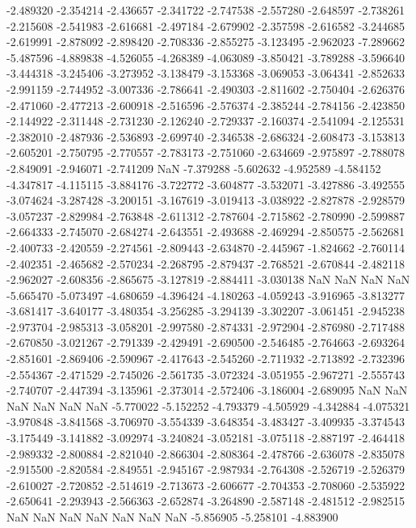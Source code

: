 -2.489320
-2.354214
-2.436657
-2.341722
-2.747538
-2.557280
-2.648597
-2.738261
-2.215608
-2.541983
-2.616681
-2.497184
-2.679902
-2.357598
-2.616582
-3.244685
-2.619991
-2.878092
-2.898420
-2.708336
-2.855275
-3.123495
-2.962023
-7.289662
-5.487596
-4.889838
-4.526055
-4.268389
-4.063089
-3.850421
-3.789288
-3.596640
-3.444318
-3.245406
-3.273952
-3.138479
-3.153368
-3.069053
-3.064341
-2.852633
-2.991159
-2.744952
-3.007336
-2.786641
-2.490303
-2.811602
-2.750404
-2.626376
-2.471060
-2.477213
-2.600918
-2.516596
-2.576374
-2.385244
-2.784156
-2.423850
-2.144922
-2.311448
-2.731230
-2.126240
-2.729337
-2.160374
-2.541094
-2.125531
-2.382010
-2.487936
-2.536893
-2.699740
-2.346538
-2.686324
-2.608473
-3.153813
-2.605201
-2.750795
-2.770557
-2.783173
-2.751060
-2.634669
-2.975897
-2.788078
-2.849091
-2.946071
-2.741209
NaN
-7.379288
-5.602632
-4.952589
-4.584152
-4.347817
-4.115115
-3.884176
-3.722772
-3.604877
-3.532071
-3.427886
-3.492555
-3.074624
-3.287428
-3.200151
-3.167619
-3.019413
-3.038922
-2.827878
-2.928579
-3.057237
-2.829984
-2.763848
-2.611312
-2.787604
-2.715862
-2.780990
-2.599887
-2.664333
-2.745070
-2.684274
-2.643551
-2.493688
-2.469294
-2.850575
-2.562681
-2.400733
-2.420559
-2.274561
-2.809443
-2.634870
-2.445967
-1.824662
-2.760114
-2.402351
-2.465682
-2.570234
-2.268795
-2.879437
-2.768521
-2.670844
-2.482118
-2.962027
-2.608356
-2.865675
-3.127819
-2.884411
-3.030138
NaN
NaN
NaN
NaN
-5.665470
-5.073497
-4.680659
-4.396424
-4.180263
-4.059243
-3.916965
-3.813277
-3.681417
-3.640177
-3.480354
-3.256285
-3.294139
-3.302207
-3.061451
-2.945238
-2.973704
-2.985313
-3.058201
-2.997580
-2.874331
-2.972904
-2.876980
-2.717488
-2.670850
-3.021267
-2.791339
-2.429491
-2.690500
-2.546485
-2.764663
-2.693264
-2.851601
-2.869406
-2.590967
-2.417643
-2.545260
-2.711932
-2.713892
-2.732396
-2.554367
-2.471529
-2.745026
-2.561735
-3.072324
-3.051955
-2.967271
-2.555743
-2.740707
-2.447394
-3.135961
-2.373014
-2.572406
-3.186004
-2.689095
NaN
NaN
NaN
NaN
NaN
NaN
-5.770022
-5.152252
-4.793379
-4.505929
-4.342884
-4.075321
-3.970848
-3.841568
-3.706970
-3.554339
-3.648354
-3.483427
-3.409935
-3.374543
-3.175449
-3.141882
-3.092974
-3.240824
-3.052181
-3.075118
-2.887197
-2.464418
-2.989332
-2.800884
-2.821040
-2.866304
-2.808364
-2.478766
-2.636078
-2.835078
-2.915500
-2.820584
-2.849551
-2.945167
-2.987934
-2.764308
-2.526719
-2.526379
-2.610027
-2.720852
-2.514619
-2.713673
-2.606677
-2.704353
-2.708060
-2.535922
-2.650641
-2.293943
-2.566363
-2.652874
-3.264890
-2.587148
-2.481512
-2.982515
NaN
NaN
NaN
NaN
NaN
NaN
NaN
-5.856905
-5.258101
-4.883900
